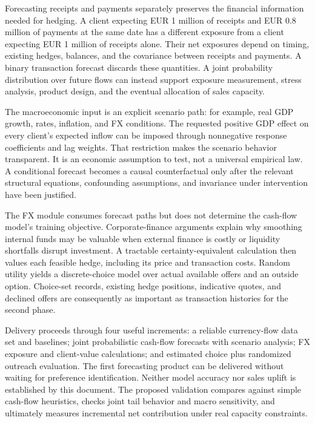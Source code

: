 \documentclass[11pt,a4paper,oneside]{report}
\numberwithin{equation}{chapter}
\begin{document}
Forecasting receipts and payments separately preserves the financial information needed for hedging. A client expecting EUR 1 million of receipts and EUR 0.8 million of payments at the same date has a different exposure from a client expecting EUR 1 million of receipts alone. Their net exposures depend on timing, existing hedges, balances, and the covariance between receipts and payments. A binary transaction forecast discards these quantities. A joint probability distribution over future flows can instead support exposure measurement, stress analysis, product design, and the eventual allocation of sales capacity.

The macroeconomic input is an explicit scenario path: for example, real GDP growth, rates, inflation, and FX conditions. The requested positive GDP effect on every client's expected inflow can be imposed through nonnegative response coefficients and lag weights. That restriction makes the scenario behavior transparent. It is an economic assumption to test, not a universal empirical law. A conditional forecast becomes a causal counterfactual only after the relevant structural equations, confounding assumptions, and invariance under intervention have been justified.

The FX module consumes forecast paths but does not determine the cash-flow model's training objective. Corporate-finance arguments explain why smoothing internal funds may be valuable when external finance is costly or liquidity shortfalls disrupt investment. A tractable certainty-equivalent calculation then values each feasible hedge, including its price and transaction costs. Random utility yields a discrete-choice model over actual available offers and an outside option. Choice-set records, existing hedge positions, indicative quotes, and declined offers are consequently as important as transaction histories for the second phase.

Delivery proceeds through four useful increments: a reliable currency-flow data set and baselines; joint probabilistic cash-flow forecasts with scenario analysis; FX exposure and client-value calculations; and estimated choice plus randomized outreach evaluation. The first forecasting product can be delivered without waiting for preference identification. Neither model accuracy nor sales uplift is established by this document. The proposed validation compares against simple cash-flow heuristics, checks joint tail behavior and macro sensitivity, and ultimately measures incremental net contribution under real capacity constraints.
\tableofcontents
\clearpage
{}












\end{document}
